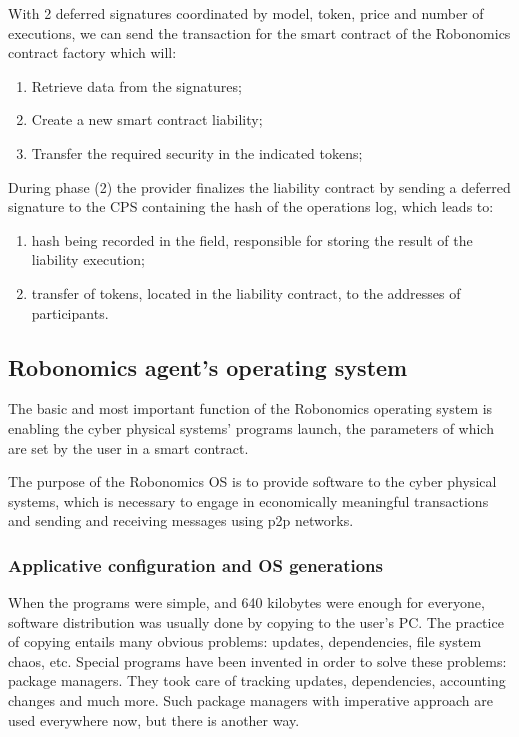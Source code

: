 \documentclass{article}
\begin{document}
With 2 deferred signatures coordinated by model, token, price and number of executions, we can send the transaction for the smart contract of the Robonomics contract factory which will:

\begin{enumerate}
	\item Retrieve data from the signatures;
	\item Create a new smart contract liability;
	\item Transfer the required security in the indicated tokens;
\end{enumerate}

During phase (2) the provider finalizes the liability contract by sending a deferred signature to the CPS containing the hash of the operations log, which leads to:
\begin{enumerate}
	\item hash being recorded in the field, responsible for storing the result of the liability execution;
	\item transfer of tokens, located in the liability contract, to the addresses of participants.
\end{enumerate}

\subsection{Robonomics agent’s operating system}

The basic and most important function of the Robonomics operating system is enabling the cyber physical systems’ programs launch, the parameters of which are set by the user in a smart contract.

The purpose of the Robonomics OS is to provide software to the cyber physical systems, which is necessary to engage in economically meaningful transactions and sending and receiving messages using p2p networks.

\subsubsection{Applicative configuration and OS generations}
When the programs were simple, and 640 kilobytes were enough for everyone, software distribution was usually done by copying to the user's PC. The practice of copying entails many obvious problems: updates, dependencies, file system chaos, etc. Special programs have been invented in order to solve these problems: package managers. They took care of tracking updates, dependencies, accounting changes and much more. Such package managers with imperative approach are used everywhere now, but there is another way.
\end{document}
